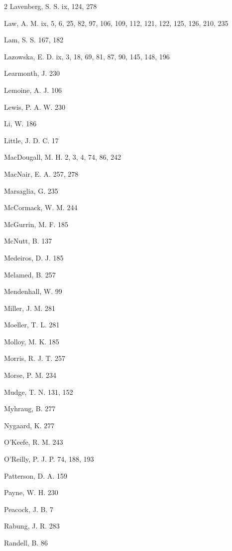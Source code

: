 \begin{multicols}{2}
\noindent Lavenberg, S. S. ix, 124, 278\par
\noindent Law, A. M. ix, 5, 6, 25, 82, 97, 106, 109, 112, 121, 122, 125, 126, 210, 235\par
\noindent Lam, S. S. 167, 182\par
\noindent Lazowska, E. D. ix, 3, 18, 69, 81, 87, 90, 145, 148, 196\par
\noindent Learmonth, J. 230\par
\noindent Lemoine, A. J. 106\par
\noindent Lewis, P. A. W. 230\par
\noindent Li, W. 186\par
\noindent Little, J. D. C. 17\par
\noindent MacDougall, M. H. 2, 3, 4, 74, 86, 242\par
\noindent MacNair, E. A. 257, 278\par
\noindent Marsaglia, G. 235\par
\noindent McCormack, W. M. 244\par
\noindent McGurrin, M. F. 185\par
\noindent McNutt, B. 137\par
\noindent Medeiros, D. J. 185\par
\noindent Melamed, B. 257\par
\noindent Mendenhall, W. 99\par
\noindent Miller, J. M. 281\par
\noindent Moeller, T. L. 281\par
\noindent Molloy, M. K. 185\par
\noindent Morris, R. J. T. 257\par
\noindent Morse, P. M. 234\par
\noindent Mudge, T. N. 131, 152\par
\noindent Myhraug, B. 277\par
\noindent Nygaard, K. 277\par
\noindent O'Keefe, R. M. 243\par
\noindent O'Reilly, P. J. P. 74, 188, 193\par
\noindent Patterson, D. A. 159\par
\noindent Payne, W. H. 230\par
\noindent Peacock, J. B. 7\par
\noindent Rabung, J. R. 283\par
\noindent Randell, B. 86\par

\end{multicols}
